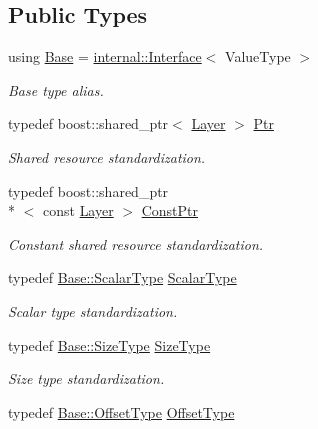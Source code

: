 \subsection*{Public Types}
\begin{DoxyCompactItemize}
\item 
using \hyperlink{classffnn_1_1layer_1_1_layer_a54b8c1b013fe141fbfc7f4dc63ab6882}{Base} = \hyperlink{classffnn_1_1layer_1_1internal_1_1_interface}{internal\-::\-Interface}$<$ Value\-Type $>$
\begin{DoxyCompactList}\small\item\em Base type alias. \end{DoxyCompactList}\item 
typedef boost\-::shared\-\_\-ptr$<$ \hyperlink{classffnn_1_1layer_1_1_layer}{Layer} $>$ \hyperlink{classffnn_1_1layer_1_1_layer_ab909b3fbacb9688059f9f22302f266f4}{Ptr}
\begin{DoxyCompactList}\small\item\em Shared resource standardization. \end{DoxyCompactList}\item 
typedef boost\-::shared\-\_\-ptr\\*
$<$ const \hyperlink{classffnn_1_1layer_1_1_layer}{Layer} $>$ \hyperlink{classffnn_1_1layer_1_1_layer_aa1b22cc70a5ae0101cae5a9825043fbc}{Const\-Ptr}
\begin{DoxyCompactList}\small\item\em Constant shared resource standardization. \end{DoxyCompactList}\item 
typedef \hyperlink{classffnn_1_1layer_1_1internal_1_1_interface_a7f834e3365e5199bcbcd16d9abd63941}{Base\-::\-Scalar\-Type} \hyperlink{classffnn_1_1layer_1_1_layer_ab63020e6e3d9270a748cb22c2432c93a}{Scalar\-Type}
\begin{DoxyCompactList}\small\item\em Scalar type standardization. \end{DoxyCompactList}\item 
typedef \hyperlink{classffnn_1_1layer_1_1internal_1_1_interface_af0567642f60c65b5e87067226a54174b}{Base\-::\-Size\-Type} \hyperlink{classffnn_1_1layer_1_1_layer_aeccac281d4220fab9cebf78b004c09d1}{Size\-Type}
\begin{DoxyCompactList}\small\item\em Size type standardization. \end{DoxyCompactList}\item 
typedef \hyperlink{classffnn_1_1layer_1_1internal_1_1_interface_adc5bb454329ebd51ac26579a43c006fd}{Base\-::\-Offset\-Type} \hyperlink{classffnn_1_1layer_1_1_layer_a0e35ffd6e0657856f3a75323b2db9fcb}{Offset\-Type}

\end{DoxyCompactItemize}
